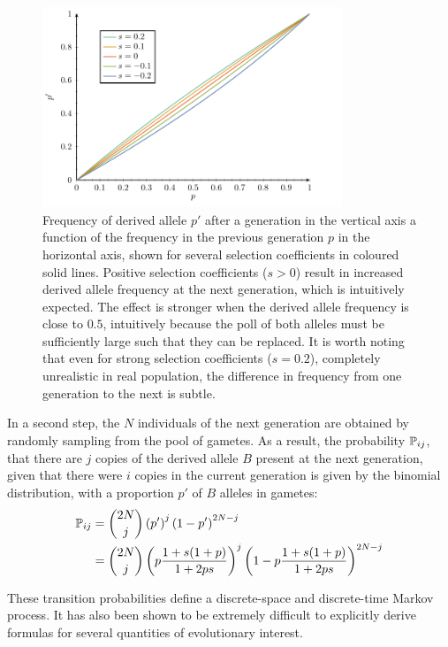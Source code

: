 \begin{figure}[H]
    \centering
    \includegraphics[width=0.8\textwidth, page=1] {figures.pdf}
    \caption[Frequency of derived {allele} after a generation]{
    Frequency of derived allele $p'$ after a generation in the vertical axis a function of the frequency in the previous generation $p$ in the horizontal axis, shown for several selection coefficients in coloured solid lines.
    Positive selection coefficients ($s > 0$) result in increased derived allele frequency at the next generation, which is intuitively expected.
    The effect is stronger when the derived allele frequency is close to $0.5$, intuitively because the poll of both alleles must be sufficiently large such that they can be replaced.
    It is worth noting that even for strong selection coefficients ($s=0.2$), completely unrealistic in real population, the difference in frequency from one generation to the next is subtle.}
    \label{fig:frequency-derived-allele}
\end{figure}


In a second step, the $N$ individuals of the next generation are obtained by randomly sampling from the pool of gametes.
As a result, the probability $\mathbb{P}_{ij}$, that there are $j$ copies of the derived allele $B$ present at the next generation, given that there were $i$ copies in the current generation is given by the binomial distribution, with a proportion $p'$ of $B$ alleles in gametes:
\begin{align}
    \mathbb{P}_{ij} & = \binom{2 N}{j} \left( p' \right)^j \left(1 - p' \right)^{2 N -j} \\
    & = \binom{2 N}{j} \left( p\dfrac{1+s(1+p)}{1 + 2ps} \right)^j \left(1 - p\dfrac{1+s(1+p)}{1 + 2ps} \right)^{2 N -j} \label{eq:binomial-WF}
\end{align}

These transition probabilities define a discrete-space and discrete-time Markov process.
It has also been shown to be extremely difficult to explicitly derive formulas for several quantities of evolutionary interest.

